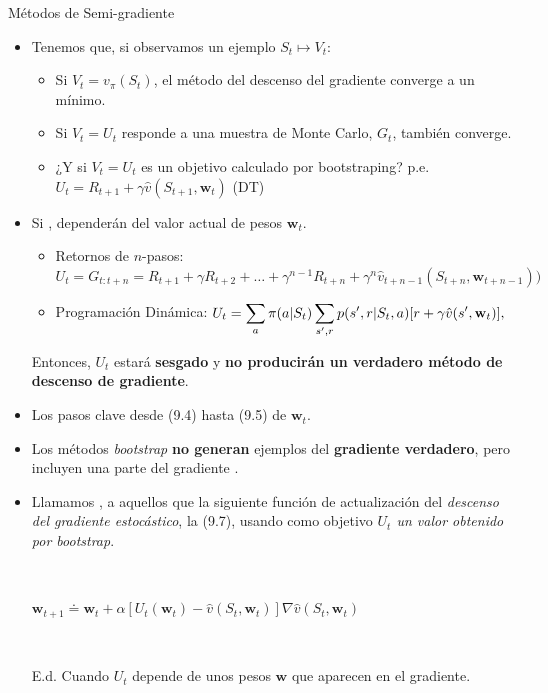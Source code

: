 \documentclass[10pt, envcountsect, handout, aspectratio=1610, hyperref={hypertexnames=true}]{beamer}
\begin{document}
\begin{frame}{Métodos de  Semi-gradiente}
	\begin{itemize}
		\item Tenemos que, si observamos un ejemplo $S_t \mapsto V_t$:
			\begin{itemize}
				\item Si $V_t=v_\pi(S_t)$, el método del descenso del gradiente converge a un mínimo.
				\item Si $V_t=U_t$ responde a una muestra de Monte Carlo, $G_t$, también converge.
				\item ¿Y si $V_t=U_t$ es un objetivo calculado por bootstraping? p.e. $U_t = R_{t+1} + \gamma \hat{v}(S_{t+1}, \mathbf{w}_t)$ (DT)
			\end{itemize}
			
		\item Si , dependerán del valor actual de pesos  \(\mathbf{w}_t\).
			\begin{itemize}
				\item Retornos de \(n\)-pasos: \(U_t = G_{t:t+n} =  R_{t+1} + \gamma R_{t+2} + \dots + \gamma^{n-1} R_{t+n} + \gamma^n \hat{v}_{t+n-1}(S_{t+n}, \mathbf{w}_{t+n-1}))\)
				\item Programación Dinámica:  
				$U_t= \displaystyle
				\sum_a \pi(a | S_t) \sum_{s', r} p(s', r | S_t, a)[r + \gamma \hat{v}(s', \mathbf{w}_t)],
				$
				
			\end{itemize}
			Entonces, $U_t$ estará \textbf{sesgado} y \textbf{no producirán un verdadero método de descenso de gradiente}.
		
		\item Los pasos clave desde (9.4) hasta (9.5)  de $\mathbf{w}_t$.
		
		\item Los métodos \textit{bootstrap} \textbf{no generan}  ejemplos del \textbf{gradiente verdadero}, pero incluyen  una parte del gradiente \citep{Barnard1993}.
		
		\item Llamamos , a aquellos que  la siguiente función de actualización del \textit{descenso del gradiente estocástico}, la (9.7), usando como objetivo \textit{$U_t$ un valor obtenido por bootstrap}.
		
		~
		
		\centerline{\large$
			\mathbf{w}_{t+1} \doteq \mathbf{w}_t + \alpha \left[ U_t(\mathbf{w}_t) - \hat{v}(S_t, \mathbf{w}_t) \right] \nabla \hat{v}(S_t, \mathbf{w}_t)
		$}
		
		~
		
		E.d. Cuando $U_t$ depende de unos pesos $\mathbf{w}$ que aparecen en el gradiente.
				
	\end{itemize}

\end{frame}
\end{document}
